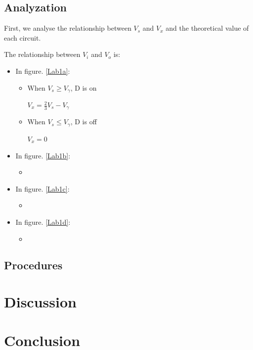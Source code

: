     \subsection{Analyzation}
    First, we analyse the relationship between $V_s$ and $V_x$ and the theoretical value of each circuit.\par
    The relationship between $V_i$ and $V_o$ is:
    \begin{itemize}
        \item In figure. \ref{Lab1a}:
            \begin{itemize}
                \item When $V_s \ge V_\gamma$, D is on\par
                    $V_x = \frac{2}{3}V_s - V_\gamma$
                \item When $V_s \le V_\gamma$, D is off\par
                    $V_x = 0$
            \end{itemize}
        \item In figure. \ref{Lab1b}:
            \begin{itemize}
                \item 
            \end{itemize}
        \item In figure. \ref{Lab1c}:
            \begin{itemize}
                \item 
            \end{itemize}
        \item In figure. \ref{Lab1d}:
            \begin{itemize}
                \item 
            \end{itemize}
    \end{itemize}

    
    \subsection{Procedures}


\section{Discussion}


\section{Conclusion}

